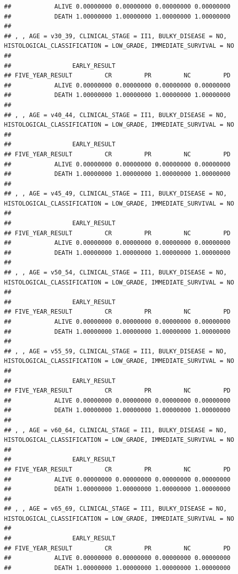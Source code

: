 \documentclass[]{article}
\begin{document}
\begin{verbatim}
##            ALIVE 0.00000000 0.00000000 0.00000000 0.00000000
##            DEATH 1.00000000 1.00000000 1.00000000 1.00000000
## 
## , , AGE = v30_39, CLINICAL_STAGE = II1, BULKY_DISEASE = NO, HISTOLOGICAL_CLASSIFICATION = LOW_GRADE, IMMEDIATE_SURVIVAL = NO
## 
##                 EARLY_RESULT
## FIVE_YEAR_RESULT         CR         PR         NC         PD
##            ALIVE 0.00000000 0.00000000 0.00000000 0.00000000
##            DEATH 1.00000000 1.00000000 1.00000000 1.00000000
## 
## , , AGE = v40_44, CLINICAL_STAGE = II1, BULKY_DISEASE = NO, HISTOLOGICAL_CLASSIFICATION = LOW_GRADE, IMMEDIATE_SURVIVAL = NO
## 
##                 EARLY_RESULT
## FIVE_YEAR_RESULT         CR         PR         NC         PD
##            ALIVE 0.00000000 0.00000000 0.00000000 0.00000000
##            DEATH 1.00000000 1.00000000 1.00000000 1.00000000
## 
## , , AGE = v45_49, CLINICAL_STAGE = II1, BULKY_DISEASE = NO, HISTOLOGICAL_CLASSIFICATION = LOW_GRADE, IMMEDIATE_SURVIVAL = NO
## 
##                 EARLY_RESULT
## FIVE_YEAR_RESULT         CR         PR         NC         PD
##            ALIVE 0.00000000 0.00000000 0.00000000 0.00000000
##            DEATH 1.00000000 1.00000000 1.00000000 1.00000000
## 
## , , AGE = v50_54, CLINICAL_STAGE = II1, BULKY_DISEASE = NO, HISTOLOGICAL_CLASSIFICATION = LOW_GRADE, IMMEDIATE_SURVIVAL = NO
## 
##                 EARLY_RESULT
## FIVE_YEAR_RESULT         CR         PR         NC         PD
##            ALIVE 0.00000000 0.00000000 0.00000000 0.00000000
##            DEATH 1.00000000 1.00000000 1.00000000 1.00000000
## 
## , , AGE = v55_59, CLINICAL_STAGE = II1, BULKY_DISEASE = NO, HISTOLOGICAL_CLASSIFICATION = LOW_GRADE, IMMEDIATE_SURVIVAL = NO
## 
##                 EARLY_RESULT
## FIVE_YEAR_RESULT         CR         PR         NC         PD
##            ALIVE 0.00000000 0.00000000 0.00000000 0.00000000
##            DEATH 1.00000000 1.00000000 1.00000000 1.00000000
## 
## , , AGE = v60_64, CLINICAL_STAGE = II1, BULKY_DISEASE = NO, HISTOLOGICAL_CLASSIFICATION = LOW_GRADE, IMMEDIATE_SURVIVAL = NO
## 
##                 EARLY_RESULT
## FIVE_YEAR_RESULT         CR         PR         NC         PD
##            ALIVE 0.00000000 0.00000000 0.00000000 0.00000000
##            DEATH 1.00000000 1.00000000 1.00000000 1.00000000
## 
## , , AGE = v65_69, CLINICAL_STAGE = II1, BULKY_DISEASE = NO, HISTOLOGICAL_CLASSIFICATION = LOW_GRADE, IMMEDIATE_SURVIVAL = NO
## 
##                 EARLY_RESULT
## FIVE_YEAR_RESULT         CR         PR         NC         PD
##            ALIVE 0.00000000 0.00000000 0.00000000 0.00000000
##            DEATH 1.00000000 1.00000000 1.00000000 1.00000000

\end{verbatim}
\end{document}
